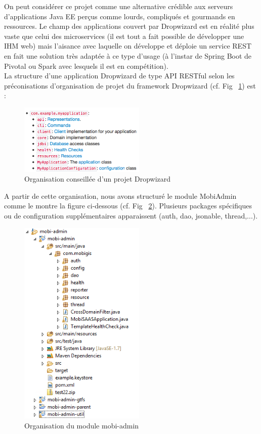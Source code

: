 \begin{itemize}
On peut considérer ce projet comme une alternative crédible aux serveurs d'applications Java EE perçus comme lourds, compliqués et gourmands en ressources. Le champ des applications couvert par Dropwizard est en réalité plus vaste que celui des microservices (il est tout a fait possible de développer une IHM web) mais l'aisance avec laquelle on développe et déploie un service REST en fait une solution très adaptée à ce type d'usage (à l'instar de Spring Boot de Pivotal ou Spark avec lesquels il est en compétition).\\

La structure d'une application Dropwizard de type API RESTful selon les préconisations d'organisation de projet du framework Dropwizard  (cf. Fig ~\ref{Organisation_Dropwizard}) est : 
\\
\begin{figure}[h]
\centering
\includegraphics[width=6cm,heigth=6cm]{images/Dropwizard_Project.png}
\caption{\label{Organisation_Dropwizard}Organisation conseillée d'un projet Dropwizard}
\end{figure} 

A partir de cette organisation, nous avons structuré le module \og MobiAdmin \fg comme le montre la figure ci-dessous (cf. Fig ~\ref{Organisation_MobiAdmin}). 
Plusieurs packages spécifiques ou de configuration supplémentaires apparaissent (auth, dao, jsonable, thread,...). 
\\
\begin{figure}[h]
\centering
\includegraphics[width=6cm,heigth=6cm]{images/Package_explorer_MobiSAAS.PNG}
\caption{\label{Organisation_MobiAdmin}Organisation du module mobi-admin}
\end{figure} 


\end{itemize}
